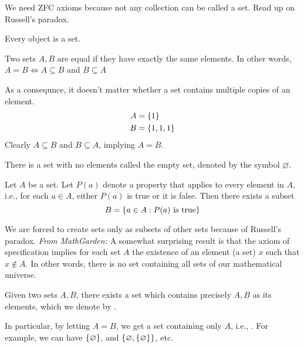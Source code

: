 \documentclass[12pt]{article}
\begin{document}
\begin{rem}
    We need ZFC axioms because not any collection can be called a set. Read up on Russell's paradox.
\end{rem}

\begin{axiom} \label{zfc:basic}
    Every object is a set.
\end{axiom}

\begin{axiom} \label{zfc:extension}
    Two sets $A, B$ are equal if they have exactly the same elements. In other words, $A = B \iff A \subseteq B$ and $B \subseteq A$
\end{axiom}
\begin{rem}
    As a consequnce, it doesn't matter whether a set contains multiple copies of an element.
    \begin{align*}
        A &= \set{ 1 } \\
        B &= \set{ 1, 1, 1 }
    \end{align*}
    Clearly $A \subseteq B$ and $B \subseteq A$, implying $A = B$.
\end{rem}

\begin{axiom} \label{zfc:existence}
    There is a set with no elements called the empty set, denoted by the symbol $\varnothing$.
\end{axiom}

\begin{axiom} \label{zfc:specification}
    Let $A$ be a set. Let $P(a)$ denote a property that applies to every element in $A$, i.e., for each $a \in A$, either $P(a)$ is true or it is false. Then there exists a subset
    \[
        B = \set{a \in A: P(a) \text{ is true}}
    \]
\end{axiom}
\begin{rem}
    We are forced to create sets only as subsets of other sets because of Russell's paradox. \textcolor{red!85!black}{\emph{From MathGarden:} A somewhat surprising result is that the axiom of specification implies for each set $A$ the existence of an element (a set) $x$ such that $x \not\in A$. In other words, there is no set containing all sets of our mathematical universe.}
\end{rem}

\begin{axiom}\label{zfc:pairing}
    Given two sets $A, B$, there exists a set which contains precisely $A, B$ as its elements, which we denote by .
\end{axiom}
\begin{rem}
    In particular, by letting $A = B$, we get a set containing only $A$, i.e., . For example, we can have $\set{\varnothing}$, and $\set{\varnothing, \{\varnothing}\}$, etc.
\end{rem}
\end{document}
